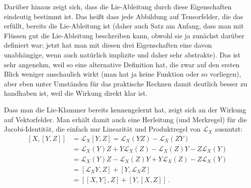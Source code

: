 \documentclass[../H_Analysis_main.tex]{subfiles}
\begin{document}
Darüber hinaus zeigt sich, dass die Lie-Ableitung durch diese Eigenschaften eindeutig bestimmt ist. Das heißt dass jede Abbildung auf Tensorfelder, die das erfüllt, bereits die Lie-Ableitung ist (daher auch Satz am Anfang, dass man mit Flüssen gut die Lie-Ableitung beschreiben kann, obwohl sie ja zunächst darüber definiert war; jetzt hat man mit diesen drei Eigenschaften eine davon unabhängige, wenn auch natürlich implizite und daher sehr abstrakte). Das ist sehr angenehm, weil so eine alternative Definition hat, die zwar auf den ersten Blick weniger anschaulich wirkt (man hat ja keine Funktion oder so vorliegen), aber eben unter Umständen für das praktische Rechnen damit deutlich besser zu handhaben ist, weil die Wirkung direkt klar ist.


\begin{bsp}
Dass man die Lie-Klammer bereits kennengelernt hat, zeigt sich an der Wirkung auf Vektorfelder. Man erhält damit auch eine Herleitung (und Merkregel) für die Jacobi-Identität, die einfach nur Linearität und Produktregel von $\mathcal{L}_X$ ausnutzt:
\begin{equation}
\begin{split}
[X,[Y,Z]] &= \mathcal{L}_X [Y,Z] = \mathcal{L}_X(YZ) - \mathcal{L}_X(ZY) 
\\
&= \mathcal{L}_X(Y) Z + Y \mathcal{L}_X(Z) - \mathcal{L}_X(Z) Y - Z \mathcal{L}_X(Y) 
\\
&= \mathcal{L}_X(Y) Z - \mathcal{L}_X(Z) Y + Y \mathcal{L}_X(Z) - Z \mathcal{L}_X(Y) 
\\
&= [\mathcal{L}_X Y,Z] + [Y,\mathcal{L}_X Z] 
\\
&= [[X,Y],Z] + [Y,[X,Z]] \, .
\end{split}
\end{equation}

\end{bsp}
\end{document}
